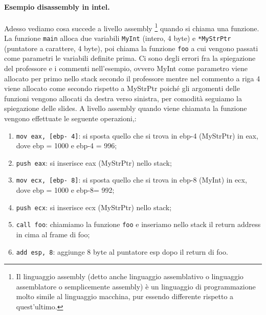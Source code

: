 \paragraph{Esempio disassembly in intel.} Adesso vediamo cosa succede a livello assembly
\footnote{Il linguaggio assembly (detto anche linguaggio assemblativo o linguaggio assemblatore o semplicemente assembly) è un linguaggio di programmazione molto simile al
    linguaggio macchina, pur essendo differente rispetto a quest'ultimo.} quando si chiama una funzione. La funzione \verb|main| alloca due variabili \verb|MyInt| (intero, 4 byte) e \verb|*MyStrPtr| (puntatore a carattere, 4 byte), poi chiama la funzione \verb|foo| a cui vengono passati come parametri le variabili definite prima. Ci sono degli errori fra la spiegazione del professore e i commenti nell'esempio, ovvero MyInt come parametro viene allocato per primo nello stack secondo il professore mentre nel commento a riga 4 viene allocato come secondo rispetto a MyStrPtr poiché gli argomenti delle funzioni vengono allocati da destra verso sinistra, per comodità seguiamo la spiegazione delle slides.
A livello assembly quando viene chiamata la funzione vengono effettuate le seguente operazioni,:
\begin{enumerate}
    \item  \verb|mov eax, [ebp- 4]|: si sposta quello che si trova in ebp-4 (MyStrPtr) in eax, dove ebp = 1000 e ebp-4 = 996;
    \item \verb|push eax|: si inserisce eax (MyStrPtr) nello stack;
    \item  \verb|mov ecx, [ebp- 8]|: si sposta quello che si trova in ebp-8 (MyInt) in ecx,  dove ebp = 1000 e ebp-8= 992;
    \item \verb|push ecx|: si inserisce ecx (MyStrPtr) nello stack;
    \item \verb|call foo|: chiamiamo la funzione \verb|foo| e inseriamo nello stack il return address in cima al frame di foo;
    \item \verb|add esp, 8|: aggiunge 8 byte al puntatore esp dopo il return di foo.
\end{enumerate}

